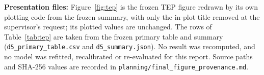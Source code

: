 \textbf{Presentation files:} Figure~\ref{fig:tep} is the frozen TEP figure redrawn by its own
plotting code from the frozen summary, with only the in-plot title removed at the supervisor's
request; its plotted values are unchanged. The rows of Table~\ref{tab:tep} are taken from the frozen primary table and summary
(\texttt{d5\_primary\_table.csv} and \texttt{d5\_summary.json}). No result was recomputed, and no
model was refitted, recalibrated or re-evaluated for this report. Source paths and SHA-256 values
are recorded in \texttt{planning/final\_figure\_provenance.md}.
